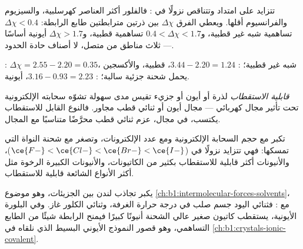 \begin{proposition}\label{prop:b1:periodicity:en-trend}
تتزايد  على امتداد  وتتناقص نزولًا في :
فالفلور أكثر العناصر كهرسلبية، والسيزيوم والفرانسيوم
أقلها. ويعطي الفرق $\Delta\chi$ بين ذرتين مترابطتين
طابع الرابطة: $\Delta\chi < 0.4$ تساهمية شبه غير قطبية،
و$0.4 < \Delta\chi < 1.7$ تساهمية قطبية، و$\Delta\chi > 1.7$ أيونية أساسًا
--- ثلاث مناطق من متصل، لا أصناف حادة الحدود.
\end{proposition}

\begin{example}\label{ex:b1:periodicity:bonds}
: $\Delta\chi = 2.55 - 2.20 = 0.35$، شبه غير قطبية؛
: $3.44 - 2.20 = 1.24$، قطبية، والأكسجين يحمل شحنة جزئية
سالبة؛ : $3.16 - 0.93 = 2.23$، أيونية.
\end{example}

\begin{definition}\label{def:b1:periodicity:polarisability}
\emph{قابلية الاستقطاب} لذرة أو أيون أو
جزيء تقيس مدى سهولة تشوّه سحابته الإلكترونية تحت تأثير
مجال كهربائي --- مجال أيون أو ثنائي قطب مجاور. فالنوع
القابل للاستقطاب يكتسب، في مجال، عزم ثنائي قطب محرَّضًا
متناسبًا مع المجال.
\end{definition}

\begin{proposition}\label{prop:b1:periodicity:polarisability-trend}
تكبر  مع حجم السحابة الإلكترونية ومع
عدد الإلكترونات، وتصغر مع شحنة النواة التي
تمسكها: فهي تتزايد نزولًا في  ($\ce{F-} < \ce{Cl-} < \ce{Br-} <
\ce{I-}$)، والأنيونات أكثر قابلية للاستقطاب بكثير من الكاتيونات، والأنيونات
الكبيرة الرخوة مثل  أكثر الأنواع الشائعة قابلية للاستقطاب.
\end{proposition}

\begin{example}\label{ex:b1:periodicity:pol}
يكبر تجاذب لندن بين الجزيئات، وهو موضوع
\cref{ch:b1:intermolecular-forces-solvents}، مع :
فثنائي اليود جسم صلب في درجة حرارة الغرفة، وثنائي الكلور غاز. وفي البلورة
الأيونية، يستقطب كاتيون صغير عالي الشحنة أنيونًا كبيرًا فيمنح
الرابطة شيئًا من الطابع التساهمي، وهو قصور النموذج الأيوني البسيط
الذي نلقاه في \cref{ch:b1:crystals-ionic-covalent}.
\end{example}

